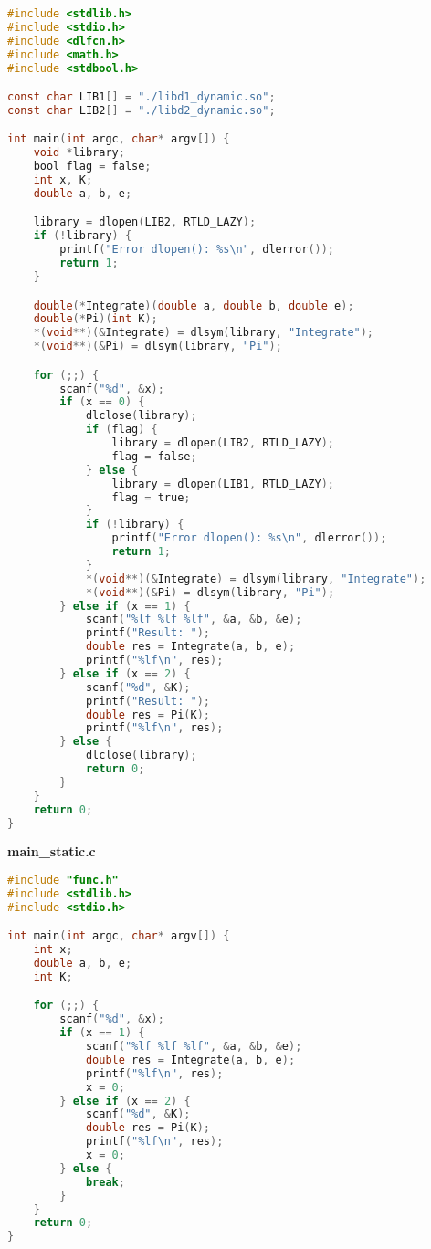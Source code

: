 \documentclass[pdf, unicode, 12pt, a4paper,oneside,fleqn]{article}
\begin{document}
\begin{lstlisting}[language=C]
#include <stdlib.h>
#include <stdio.h>
#include <dlfcn.h>
#include <math.h>
#include <stdbool.h>

const char LIB1[] = "./libd1_dynamic.so";
const char LIB2[] = "./libd2_dynamic.so";

int main(int argc, char* argv[]) {
    void *library;
    bool flag = false;
    int x, K;
    double a, b, e;

    library = dlopen(LIB2, RTLD_LAZY);
    if (!library) {
        printf("Error dlopen(): %s\n", dlerror());
        return 1;
    }

    double(*Integrate)(double a, double b, double e);
    double(*Pi)(int K);
    *(void**)(&Integrate) = dlsym(library, "Integrate");
    *(void**)(&Pi) = dlsym(library, "Pi");

    for (;;) {
        scanf("%d", &x);
        if (x == 0) {
            dlclose(library);
            if (flag) {
                library = dlopen(LIB2, RTLD_LAZY);
                flag = false;
            } else {
                library = dlopen(LIB1, RTLD_LAZY);
                flag = true;
            }
            if (!library) {
                printf("Error dlopen(): %s\n", dlerror());
                return 1;
            }
            *(void**)(&Integrate) = dlsym(library, "Integrate");
            *(void**)(&Pi) = dlsym(library, "Pi");
        } else if (x == 1) {
            scanf("%lf %lf %lf", &a, &b, &e);
            printf("Result: ");
            double res = Integrate(a, b, e);
            printf("%lf\n", res);
        } else if (x == 2) {
            scanf("%d", &K);
            printf("Result: ");
            double res = Pi(K);
            printf("%lf\n", res);
        } else {
            dlclose(library);
            return 0;
        }
    }
    return 0;
}
\end{lstlisting}

{\large\textbf{main\_static.c}}

\begin{lstlisting}[language=C]
#include "func.h"
#include <stdlib.h>
#include <stdio.h>

int main(int argc, char* argv[]) {
    int x;
    double a, b, e;
    int K;

    for (;;) {
        scanf("%d", &x);
        if (x == 1) {
            scanf("%lf %lf %lf", &a, &b, &e);
            double res = Integrate(a, b, e);
            printf("%lf\n", res);
            x = 0;
        } else if (x == 2) {
            scanf("%d", &K);
            double res = Pi(K);
            printf("%lf\n", res);
            x = 0;
        } else {
            break;
        }
    }
    return 0;
}
\end{lstlisting}
\end{document}

